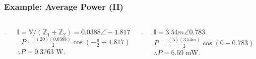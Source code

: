 \documentclass{beamer}
\begin{document}
\begin{frame}[fragile]
\frametitle{Example: Average Power (II)}

\begin{columns}[c]


\includegraphics[width=\textwidth]{src/APexample1soln1.png}

$\mathbb{I} = \mathbb{V}/(\mathbb{Z}_1 + \mathbb{Z}_2)= 0.0388 \angle -1.817$.
$P = \frac{(20)(0.0388)}{2} \cos(-\frac{\pi}{2} + 1.817)$
\\ $\therefore P = 0.3763$ W.


\includegraphics[width=\textwidth]{src/APexample1soln2.png}

$\mathbb{I} = 3.54m \angle 0.783$.
$P = \frac{(5)(3.54m)}{2} \cos(0-0.783)$
\\ $\therefore P = 6.59$ mW.


\end{columns}

\end{frame}
\end{document}
